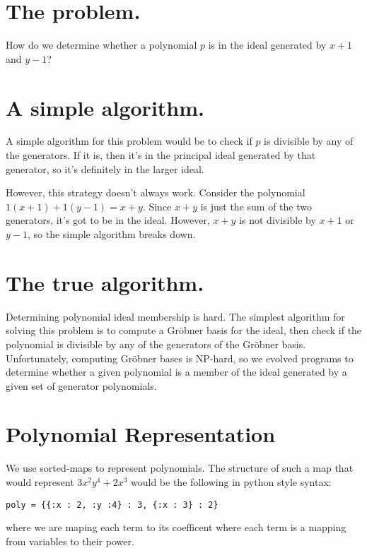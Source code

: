\documentclass[20pt]{extarticle}
\begin{document}
\newpage
\section*{The problem.}

    How do we determine whether a polynomial $p$ is in the ideal generated by $x+1$ and $y-1$?

\newpage
\section*{A simple algorithm.}

    A simple algorithm for this problem would be to check if $p$ is divisible by any of the generators.
    If it is, then it's in the principal ideal generated by that generator, so it's definitely in the larger ideal.

    However, this strategy doesn't always work.
    Consider the polynomial $1(x+1) + 1(y-1) = x + y$.
    Since $x+y$ is just the sum of the two generators, it's got to be in the ideal.
    However, $x + y$ is not divisible by $x+1$ or $y-1$, so the simple algorithm breaks down.

\newpage
\section*{The true algorithm.}

    Determining polynomial ideal membership is hard.
    The simplest algorithm for solving this problem is to compute a Gr\"obner basis for the ideal, then check if the polynomial is divisible by any of the generators of the Gr\"obner basis.
    Unfortunately, computing Gr\"obner bases is NP-hard, so we evolved programs to determine whether a given polynomial is a member of the ideal generated by a given set of generator polynomials.

\newpage
\section*{Polynomial Representation}

We use sorted-maps to represent polynomials. The structure of such a map that would represent $3x^2y^4 + 2x^3$ would be the following in python style syntax:

\begin{verbatim}
poly = {{:x : 2, :y :4} : 3, {:x : 3} : 2}
\end{verbatim}

 where we are maping each term to its coefficent where each term is a mapping from variables to their power.
\end{document}
